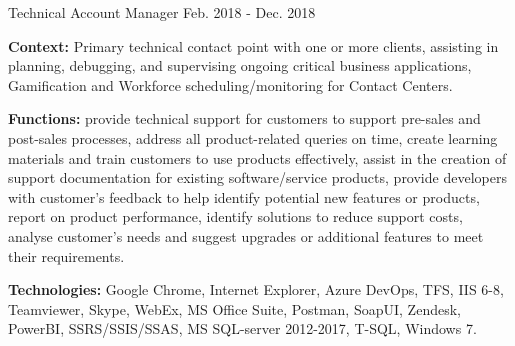 \begin{cventries}
  \cventry
    {Technical Account Manager} %
    {} %
    {} %
    {Feb. 2018 - Dec. 2018} %
    {
      \begin{cvitems} %
		\item[] {\textbf{Context:} Primary technical contact point with one or more clients, assisting in planning, debugging, and supervising ongoing critical business applications, Gamification and Workforce scheduling/monitoring for Contact Centers.}
		\item[] {\textbf{Functions:} provide technical support for customers to support pre-sales and post-sales processes, address all product-related queries on time, create learning materials and train customers to use products effectively, assist in the creation of support documentation for existing software/service products, provide developers with customer's feedback to help identify potential new features or products, report on product performance, identify solutions to reduce support costs, analyse customer's needs and suggest upgrades or additional features to meet their requirements.}		
		\item[] {\textbf{Technologies:} \textcolor{rainbowcolor-olive}{Google Chrome}, \textcolor{rainbowcolor-olive}{Internet Explorer}, \textcolor{rainbowcolor-olive}{Azure DevOps}, \textcolor{rainbowcolor-olive}{TFS}, \textcolor{rainbowcolor-olive}{IIS 6-8}, %
\textcolor{rainbowcolor-olive}{Teamviewer}, \textcolor{rainbowcolor-olive}{Skype}, \textcolor{rainbowcolor-olive}{WebEx}, \textcolor{rainbowcolor-olive}{MS Office Suite}, \textcolor{rainbowcolor-olive}{Postman}, \textcolor{rainbowcolor-olive}{SoapUI}, \textcolor{rainbowcolor-olive}{Zendesk}, \textcolor{rainbowcolor-olive}{PowerBI}, \textcolor{rainbowcolor-olive}{SSRS/SSIS/SSAS}, \textcolor{rainbowcolor-olive}{MS SQL-server 2012-2017},  \textcolor{rainbowcolor-indigo}{T-SQL}, \textcolor{rainbowcolor-orange}{Windows 7}.}		
      \end{cvitems}
    } 
    

\end{cventries}
